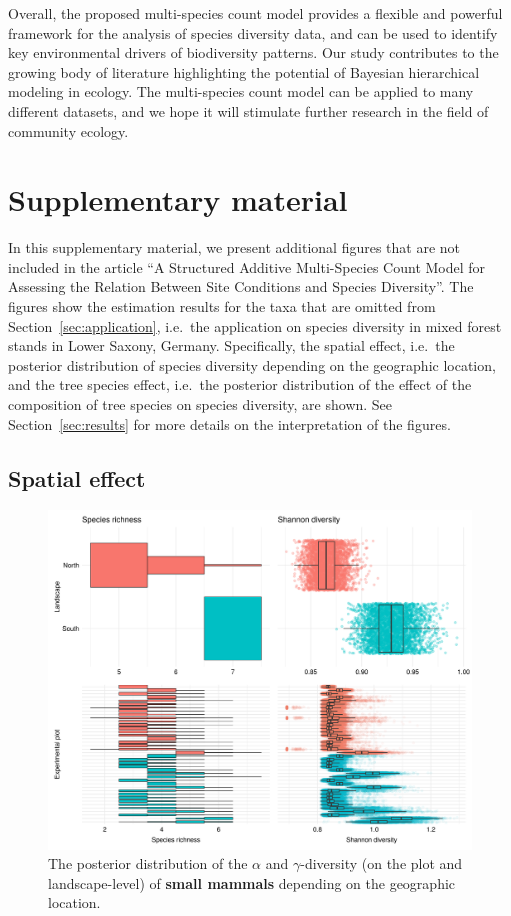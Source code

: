 \documentclass{article}
\begin{document}
Overall, the proposed multi-species count model provides a flexible and powerful framework for the analysis of species diversity data, and can be used to identify key environmental drivers of biodiversity patterns. Our study contributes to the growing body of literature highlighting the potential of Bayesian hierarchical modeling in ecology. The multi-species count model can be applied to many different datasets, and we hope it will stimulate further research in the field of community ecology.

\clearpage
\nocite{tangeGNU2023}



\clearpage
\section*{Supplementary material}

In this supplementary material, we present additional figures that are not included in the article ``A Structured Additive Multi-Species Count Model for Assessing the Relation Between Site Conditions and Species Diversity''. The figures show the estimation results for the taxa that are omitted from Section~\ref{sec:application}, i.e.~the application on species diversity in mixed forest stands in Lower Saxony, Germany. Specifically, the spatial effect, i.e.~the posterior distribution of species diversity depending on the geographic location, and the tree species effect, i.e.~the posterior distribution of the effect of the composition of tree species on species diversity, are shown. See Section~\ref{sec:results} for more details on the interpretation of the figures.

\subsection*{Spatial effect}

\begin{figure}[ht!]
\centering
\includegraphics[width=\linewidth]{figures/rtg-diversity-sma-geo}
\caption{The posterior distribution of the $\alpha$ and $\gamma$-diversity (on the plot and landscape-level) of \textbf{small mammals} depending on the geographic location.}
\label{fig:rtg-diversity-sma-geo}
\end{figure}
\end{document}
